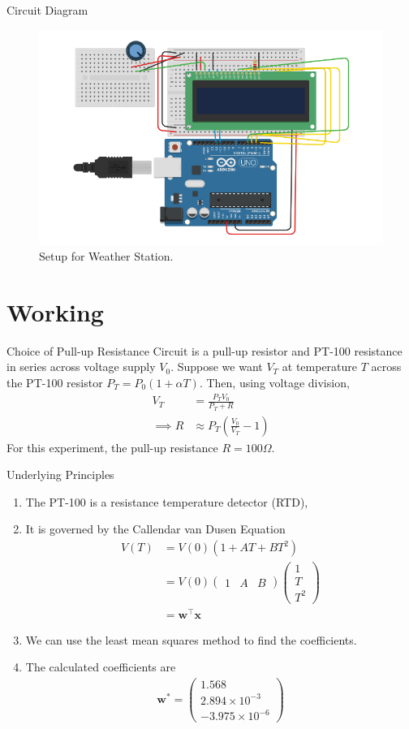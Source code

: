 \documentclass{beamer}
\providecommand{\brak}[1]{\ensuremath{\left(#1\right)}}
\theoremstyle{remark}
\newcommand{\myvec}[1]{\ensuremath{\begin{pmatrix}#1\end{pmatrix}}}
\renewcommand{\vec}[1]{\mathbf{\boldsymbol{#1}}}
\begin{document}
\begin{frame}{Circuit Diagram}
    \begin{figure}[!ht]
        \centering
        \includegraphics[width=0.6\columnwidth]{figs/esp32.png}
        \caption{Setup for Weather Station.}
        \label{fig:setup}
    \end{figure}
\end{frame}

\section{Working}
\begin{frame}{Choice of Pull-up Resistance}
    Circuit is a pull-up resistor and PT-100 resistance in series across 
    voltage supply $V_0$.
    Suppose we want $V_T$ at temperature $T$ across the PT-100 resistor 
    $P_T = P_0\brak{1+\alpha T}$. Then, using voltage division,
    \begin{align}
        V_T &= \frac{P_TV_0}{P_T + R} \\
        \implies R &\approx P_T\brak{\frac{V_0}{V_T} - 1}
        \label{eq:R-est}
    \end{align}
    For this experiment, the pull-up resistance $R = 100 \Omega$.
\end{frame}

\begin{frame}{Underlying Principles}
    \begin{enumerate}
        \item The PT-100 is a resistance temperature detector (RTD),
        \item It is governed by the Callendar van Dusen Equation
        \begin{align}
            V(T) &= V(0)\brak{1 + AT + BT^2} \\
                 &= V(0)\myvec{1&A&B}\myvec{1\\T\\T^2} \\
                 &= \vec{w}^\top\vec{x}
        \end{align}
        \item We can use the least mean squares method to find the coefficients.
        \item The calculated coefficients are
        \begin{align}
            \vec{w^*} = \myvec{1.568\\2.894 \times 10^{-3} \\ -3.975 \times 10^{-6}}
        \end{align}
    \end{enumerate}
\end{frame}
\end{document}
